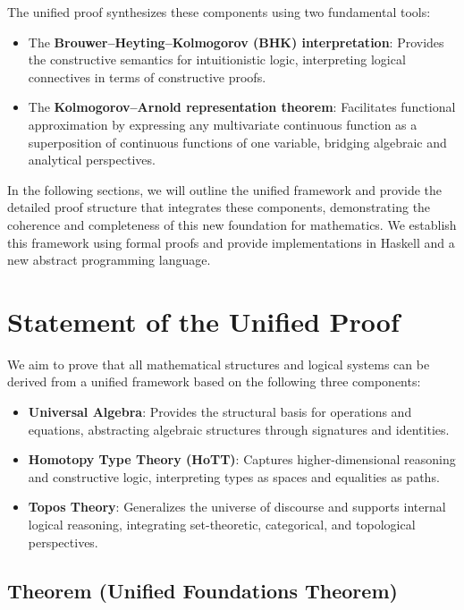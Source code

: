 \documentclass{article}
\begin{document}
The unified proof synthesizes these components using two fundamental tools:

\begin{itemize}
    \item The \textbf{Brouwer–Heyting–Kolmogorov (BHK) interpretation}: Provides the constructive semantics for intuitionistic logic, interpreting logical connectives in terms of constructive proofs.
    \item The \textbf{Kolmogorov–Arnold representation theorem}: Facilitates functional approximation by expressing any multivariate continuous function as a superposition of continuous functions of one variable, bridging algebraic and analytical perspectives.
\end{itemize}

In the following sections, we will outline the unified framework and provide the detailed proof structure that integrates these components, demonstrating the coherence and completeness of this new foundation for mathematics. We establish this framework using formal proofs and provide implementations in Haskell and a new abstract programming language.

\section{Statement of the Unified Proof}

We aim to prove that all mathematical structures and logical systems can be derived from a unified framework based on the following three components:

\begin{itemize}
    \item \textbf{Universal Algebra}: Provides the structural basis for operations and equations, abstracting algebraic structures through signatures and identities.
    \item \textbf{Homotopy Type Theory (HoTT)}: Captures higher-dimensional reasoning and constructive logic, interpreting types as spaces and equalities as paths.
    \item \textbf{Topos Theory}: Generalizes the universe of discourse and supports internal logical reasoning, integrating set-theoretic, categorical, and topological perspectives.
\end{itemize}

\subsection*{Theorem (Unified Foundations Theorem)}
\end{document}
